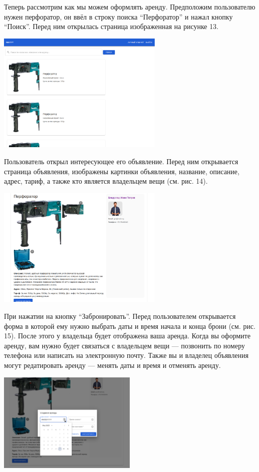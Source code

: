 \documentclass[14pt]{extarticle}
\begin{document}
Теперь рассмотрим как мы можем оформлять аренду.
Предположим пользователю нужен перфоратор, он ввёл в строку поиска ``Перфоратор''
и нажал кнопку ``Поиск''. Перед ним открылась страница изображенная на рисунке 13.

\begin{center}
    \includegraphics[width=0.6\textwidth]{search.png}
\end{center}

Пользователь открыл интересующее его объявление. Перед ним открывается
страница объявления, изображены картинки объявления, название,
описание, адрес, тариф, а также кто является владельцем вещи (см. рис. 14).

\begin{center}
    \includegraphics[width=0.6\textwidth]{perforator.png}
\end{center}

При нажатии на кнопку ``Забронировать''. Перед пользователем открывается форма
в которой ему нужно выбрать даты и время начала и конца брони (см. рис. 15).
После этого у владельца будет отображена ваша аренда.
Когда вы оформите аренду, вам нужно будет связаться с владельцем вещи
--- позвонить по номеру телефона или написать на электронную почту.
Также вы и владелец объявления могут редатировать аренду --- менять
даты и время и отменять аренду.

\begin{center}
    \includegraphics[width=0.5\textwidth]{booking.png}
\end{center}
\end{document}
